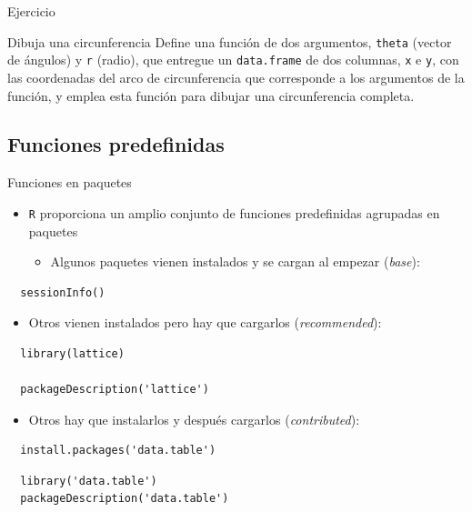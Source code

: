 \documentclass[aspectratio=169, usenames,svgnames,dvipsnames]{beamer}
\begin{document}
\begin{frame}[label={sec:org8d12f42},fragile]{Ejercicio}
 \begin{block}{Dibuja una circunferencia}
Define una función de dos argumentos, \texttt{theta} (vector de ángulos) y
\texttt{r} (radio), que entregue un \texttt{data.frame} de dos columnas, \texttt{x} e \texttt{y},
con las coordenadas del arco de circunferencia que corresponde a los
argumentos de la función, y emplea esta función para dibujar una
circunferencia completa.
\end{block}
\end{frame}


\subsection{Funciones predefinidas}
\label{sec:orga213b48}

\begin{frame}[label={sec:org68d2bc2},fragile]{Funciones en paquetes}
 \begin{itemize}
\item \texttt{R} proporciona un amplio conjunto de funciones predefinidas agrupadas en paquetes

\begin{itemize}
\item Algunos paquetes vienen instalados y se cargan al empezar (\emph{base}):
\end{itemize}
\end{itemize}
\lstset{language=r,label= ,caption= ,captionpos=b,numbers=none}
\begin{lstlisting}
  sessionInfo()
\end{lstlisting}
\begin{itemize}
\item Otros vienen instalados pero hay que cargarlos (\emph{recommended}):
\end{itemize}
\lstset{language=r,label= ,caption= ,captionpos=b,numbers=none}
\begin{lstlisting}
  library(lattice)

  packageDescription('lattice')
\end{lstlisting}
\begin{itemize}
\item Otros hay que instalarlos y después cargarlos (\emph{contributed}):
\end{itemize}
\lstset{language=r,label= ,caption= ,captionpos=b,numbers=none}
\begin{lstlisting}
  install.packages('data.table')
\end{lstlisting}

\lstset{language=r,label= ,caption= ,captionpos=b,numbers=none}
\begin{lstlisting}
  library('data.table')
  packageDescription('data.table')
\end{lstlisting}
\end{frame}
\end{document}
